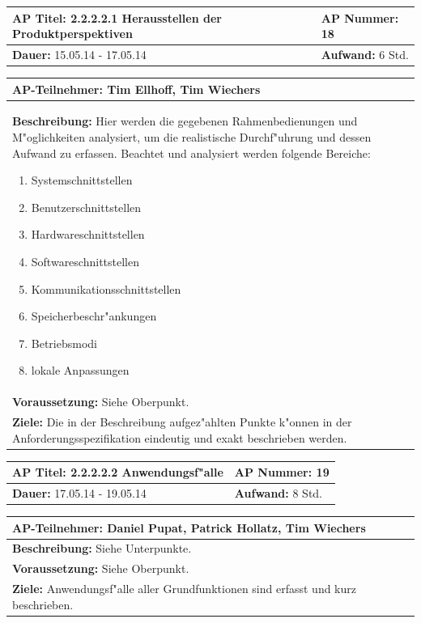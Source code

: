 \documentclass[fontsize=12pt,paper=a4,twoside]{scrartcl}
\begin{document}
\begin{tabular}{|p{7.43cm}|p{7.43cm}|}
\hline
\textbf{AP Titel: } 2.2.2.2.1 Herausstellen der Produktperspektiven & \textbf{AP Nummer: }18\\ 
\hline
\textbf{Dauer: }15.05.14 - 17.05.14 & \textbf{Aufwand: } 6 Std.\\
\hline
\end{tabular}
\begin{tabular}{|p{15.3cm}|}
\hline
\textbf{AP-Teilnehmer: }Tim Ellhoff, Tim Wiechers\\
\hline
\textbf{Beschreibung: }Hier werden die gegebenen Rahmenbedienungen und M"oglichkeiten analysiert, um die realistische Durchf"uhrung und dessen Aufwand zu erfassen. Beachtet und analysiert werden folgende Bereiche:
\begin{enumerate}
 \item Systemschnittstellen
 \item Benutzerschnittstellen
 \item Hardwareschnittstellen
 \item Softwareschnittstellen
 \item Kommunikationsschnittstellen
 \item Speicherbeschr"ankungen
 \item Betriebsmodi
 \item lokale Anpassungen
\end{enumerate}
\\
\hline
\textbf{Voraussetzung: }Siehe Oberpunkt.\\
\hline 
\textbf{Ziele: } Die in der Beschreibung aufgez"ahlten Punkte k"onnen in der Anforderungsspezifikation eindeutig und exakt beschrieben werden.\\
\hline 
\end{tabular}

\begin{tabular}{|p{7.43cm}|p{7.43cm}|}
\hline
\textbf{AP Titel: }2.2.2.2.2 Anwendungsf"alle & \textbf{AP Nummer: }19\\ 
\hline
\textbf{Dauer: }17.05.14 - 19.05.14 & \textbf{Aufwand: } 8 Std.\\
\hline
\end{tabular}
\begin{tabular}{|p{15.3cm}|}
\hline
\textbf{AP-Teilnehmer: }Daniel Pupat, Patrick Hollatz, Tim Wiechers\\
\hline
\textbf{Beschreibung: }Siehe Unterpunkte.\\
\hline
\textbf{Voraussetzung: }Siehe Oberpunkt.\\
\hline 
\textbf{Ziele: }Anwendungsf"alle aller Grundfunktionen sind erfasst und kurz beschrieben.\\
\hline 
\end{tabular}
\end{document}
